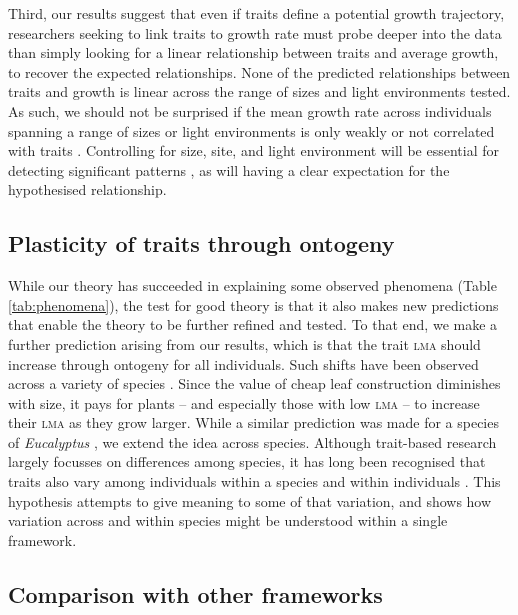 \documentclass[9pt,twocolumn,twoside,lineno]{pnas-new}
\newcommand{\lma}{\textsc{lma}}
\begin{document}
Third, our results suggest that even if traits define a potential growth trajectory, researchers seeking to link traits to growth rate must probe deeper into the data than simply looking for a linear relationship between traits and average growth, to recover the expected relationships. None of the predicted relationships between traits and growth is linear across the range of sizes and light environments tested. As such, we should not be surprised if the mean growth rate across individuals spanning a range of sizes or light environments is only weakly or not correlated with traits \citep[e.g.][]{Poorter-2008,Paine-2015}. Controlling for size, site, and light environment will be essential for detecting significant patterns \citep[e.g.][]{Gibert-2016}, as will having a clear expectation for the hypothesised relationship.

\subsection*{Plasticity of traits through ontogeny}

While our theory has succeeded in explaining some observed phenomena (Table \ref{tab:phenomena}), the test for good theory is that it also makes new predictions that enable the theory to be further refined and tested. To that end, we make a further prediction arising from our results, which is that the trait {\lma} should increase through ontogeny for all individuals. Such shifts have been observed across a variety of species \citep{King-1999,Thomas-1999,Koch-2004}. Since the value of cheap leaf construction diminishes with size, it pays for plants -- and especially those with low {\lma} -- to increase their {\lma} as they grow larger. While a similar prediction was made for a species of \emph{Eucalyptus} \citep{King-1999}, we extend the idea across species. Although trait-based research largely focusses on differences among species, it has long been recognised that traits also vary among individuals within a species and within individuals \citep{Westoby-2002}. This hypothesis attempts to give meaning to some of that variation, and shows how variation across and within species might be understood within a single framework.

\subsection*{Comparison with other frameworks}
\end{document}

